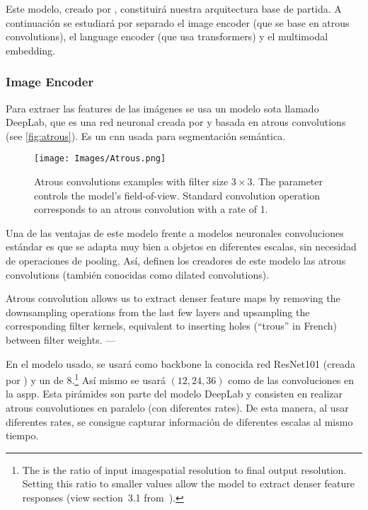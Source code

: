 Este modelo, creado por , constituirá nuestra
arquitectura base de partida. A continuación se estudiará por separado el image
encoder (que se base en atrous convolutions), el language encoder (que usa
transformers) y el multimodal embedding.

\subsubsection{Image Encoder}
Para extraer las features de las imágenes se usa un modelo \gls{sota} llamado
DeepLab, que es una red neuronal creada por  y basada en
atrous convolutions (see \vref{fig:atrous}). Es un \gls{cnn} usada para
segmentación semántica.

\begin{figure}[htb]
  \centering
  \texttt{[image: Images/Atrous.png]}
  \caption[Atrous convolutions examples]{Atrous convolutions examples with
    filter size \(3 \times 3\). The  parameter controls the model's
    field-of-view. Standard convolution operation corresponds to an atrous
    convolution with a rate of 1.}
  \label{fig:atrous}
\end{figure}

Una de las ventajas de este modelo frente a modelos neuronales convoluciones
estándar es que se adapta muy bien a objetos en diferentes escalas, sin
necesidad de operaciones de pooling. Así, definen los creadores de este modelo
las atrous convolutions (también conocidas como dilated convolutions).

\begin{quoteBox}
  Atrous convolution allows us to extract denser feature maps by removing the
  downsampling operations from the last few layers and upsampling the
  corresponding filter kernels, equivalent to inserting holes (``trous'' in
  French) between filter weights.
  \tcblower{}
  ---
\end{quoteBox}

En el modelo usado, se usará como backbone la conocida red ResNet101 (creada
por ) y un  de 8.\footnote{The
   is the ratio of input imagespatial resolution to final
  output resolution. Setting this ratio to smaller values allow the model to
  extract denser feature responses (view section~3.1
  from~\cite{chen17:rethin}).} Así mismo se usará \((12, 24, 36)\) como
 de las convoluciones en la \gls{aspp}. Esta pirámides son parte
del modelo DeepLab y consisten en realizar atrous convolutiones en paralelo
(con diferentes rates). De esta manera, al usar diferentes rates, se consigue
capturar información de diferentes escalas al mismo tiempo.

